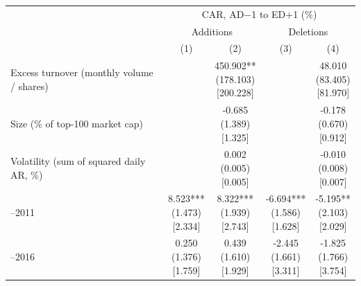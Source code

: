 \begin{threeparttable}
\begingroup
\renewcommand\cellalign{t}
\renewcommand\arraystretch{1}
\setlength{\tabcolsep}{5pt}
\begin{tabular}{@{}lcccc}
\toprule
 & \multicolumn{4}{c}{CAR, AD$-$1 to ED+1 (\%)} \\
\cmidrule(lr){2-5}
 & \multicolumn{2}{c}{Additions} & \multicolumn{2}{c}{Deletions} \\
\cmidrule(lr){2-3} \cmidrule(lr){4-5}
 & (1) & (2) & (3) & (4) \\
\midrule
\addlinespace[1ex]
Excess turnover (monthly volume / shares) &  & \makecell{450.902** \\ (178.103) \\{}[200.228]} &  & \makecell{48.010 \\ (83.405) \\{}[81.970]} \\
\addlinespace[0.25ex]
\addlinespace[0.25ex]
Size (\% of top-100 market cap) &  & \makecell{-0.685 \\ (1.389) \\{}[1.325]} &  & \makecell{-0.178 \\ (0.670) \\{}[0.912]} \\
\addlinespace[0.25ex]
\addlinespace[0.25ex]
Volatility (sum of squared daily AR, \%) &  & \makecell{0.002 \\ (0.005) \\{}[0.005]} &  & \makecell{-0.010 \\ (0.008) \\{}[0.007]} \\
\addlinespace[0.25ex]
\addlinespace[0.25ex]
2007–2011 & \makecell{8.523*** \\ (1.473) \\{}[2.334]} & \makecell{8.322*** \\ (1.939) \\{}[2.743]} & \makecell{-6.694*** \\ (1.586) \\{}[1.628]} & \makecell{-5.195** \\ (2.103) \\{}[2.029]} \\
\addlinespace[0.25ex]
\addlinespace[0.25ex]
2012–2016 & \makecell{0.250 \\ (1.376) \\{}[1.759]} & \makecell{0.439 \\ (1.610) \\{}[1.929]} & \makecell{-2.445 \\ (1.661) \\{}[3.311]} & \makecell{-1.825 \\ (1.766) \\{}[3.754]} \\

\end{tabular}
\end{threeparttable}
